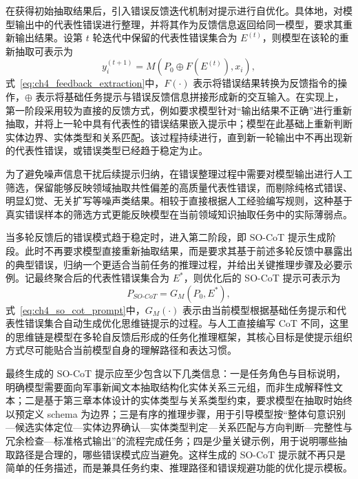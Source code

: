 在获得初始抽取结果后，引入错误反馈迭代机制对提示进行自优化。具体地，对模型输出中的代表性错误进行整理，并将其作为反馈信息返回给同一模型，要求其重新输出结果。设第 $t$ 轮迭代中保留的代表性错误集合为 $E^{(t)}$，则模型在该轮的重新抽取可表示为
\begin{equation}
y_i^{(t+1)} = M(P_0 \oplus F(E^{(t)}), x_i),
\label{eq:ch4_feedback_extraction}
\end{equation}
式~\eqref{eq:ch4_feedback_extraction}中，$F(\cdot)$ 表示将错误结果转换为反馈指令的操作，$\oplus$ 表示将基础任务提示与错误反馈信息拼接形成新的交互输入。在实现上，第一阶段采用较为直接的反馈方式，例如要求模型针对“输出结果不正确”进行重新抽取，并将上一轮中具有代表性的错误结果嵌入提示中；模型在此基础上重新判断实体边界、实体类型和关系匹配。该过程持续进行，直到新一轮输出中不再出现新的代表性错误，或错误类型已经趋于稳定为止。

为了避免噪声信息干扰后续提示归纳，在错误整理过程中需要对模型输出进行人工筛选，保留能够反映领域抽取共性偏差的高质量代表性错误，而剔除纯格式错误、明显幻觉、无关扩写等噪声类结果。相较于直接根据人工经验编写规则，这种基于真实错误样本的筛选方式更能反映模型在当前领域知识抽取任务中的实际薄弱点。

当多轮反馈后的错误模式趋于稳定时，进入第二阶段，即 SO-CoT 提示生成阶段。此时不再要求模型直接重新抽取结果，而是要求其基于前述多轮反馈中暴露出的典型错误，归纳一个更适合当前任务的推理过程，并给出关键推理步骤及必要示例。记最终聚合后的代表性错误集合为 $E^*$，则优化后的 SO-CoT 提示可表示为
\begin{equation}
P_{SO\text{-}CoT} = G_M(P_0, E^*),
\label{eq:ch4_so_cot_prompt}
\end{equation}
式~\eqref{eq:ch4_so_cot_prompt}中，$G_M(\cdot)$ 表示由当前模型根据基础任务提示和代表性错误集合自动生成优化思维链提示的过程。与人工直接编写 CoT 不同，这里的思维链是模型在多轮自反馈后形成的任务化推理框架，其核心目标是使提示组织方式尽可能贴合当前模型自身的理解路径和表达习惯。

最终生成的 SO-CoT 提示应至少包含以下几类信息：一是任务角色与目标说明，明确模型需要面向军事新闻文本抽取结构化实体关系三元组，而非生成解释性文本；二是基于第三章本体设计的实体类型与关系类型约束，要求模型在抽取时始终以预定义 schema 为边界；三是有序的推理步骤，用于引导模型按“整体句意识别—候选实体定位—实体边界确认—实体类型判定—关系匹配与方向判断—完整性与冗余检查—标准格式输出”的流程完成任务；四是少量关键示例，用于说明哪些抽取路径是合理的，哪些错误模式应当避免。这样生成的 SO-CoT 提示就不再只是简单的任务描述，而是兼具任务约束、推理路径和错误规避功能的优化提示模板。

